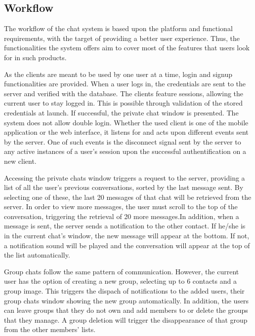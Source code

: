 \documentclass{article}
\begin{document}
	\subsection{Workflow}
	
	The workflow of the chat system is based upon the platform and functional requirements, with the target of providing a better user experience. Thus, the functionalities the system offers aim to cover most of the features that users look for in such products.\par
	
	As the clients are meant to be used by one user at a time, login and signup functionalities are provided. When a user logs in, the credentials are sent to the server and verified with the database. The clients feature sessions, allowing the current user to stay logged in. This is possible through validation of the stored credentials at launch. If successful, the private chat window is presented. The system does not allow double login. Whether the used client is one of the mobile application or the web interface, it listens for and acts upon different events sent by the server. One of such events is the disconnect signal sent by the server to any active instances of a user's session upon the successful authentification on a new client.\par
	
	Accessing the private chats window triggers a request to the server, providing a list of all the user's previous conversations, sorted by the last message sent. By selecting one of these, the last 20 messages of that chat will be retrieved from the server. In order to view more messages, the user must scroll to the top of the conversation, triggering the retrieval of 20 more messages.In addition, when a message is sent, the server sends a notification to the other contact. If he/she is in the current chat's window, the new message will appear at the bottom. If not, a notification sound will be played and the conversation will appear at the top of the list automatically.\par
	
	Group chats follow the same pattern of communication. However, the current user has the option of creating a new group, selecting up to 6 contacts and a group image. This triggers the dispach of notifications to the added users, their group chats window showing the new group automatically. In addition, the users can leave groups that they do not own and add members to or delete the groups that they manage. A group deletion will trigger the disappearance of that group from the other members' lists.\par
	
\end{document}
